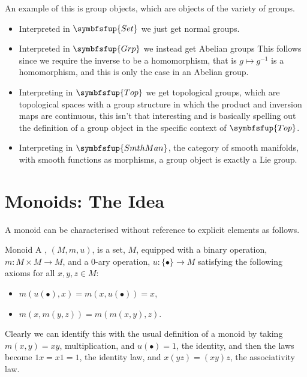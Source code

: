\documentclass[fleqn]{NotesClass}
\makeatletter
\newcommand{\c@egory}[1]{\symbfsfup{#1}}
\newcommand{\Set}{\c@egory{Set}}
\newcommand{\Grp}{\c@egory{Grp}}
\newcommand{\Top}{\c@egory{Top}}
\makeatother
\begin{document}
    An example of this is group objects, which are objects of the variety of groups.
    \begin{itemize}
        \item Interpreted in \(\Set\) we just get normal groups.
        \item Interpreted in \(\Grp\) we instead get Abelian groups
        This follows since we require the inverse to be a homomorphism, that is \(g \mapsto g^{-1}\) is a homomorphism, and this is only the case in an Abelian group.
        \item Interpreting in \(\Top\) we get topological groups, which are topological spaces with a group structure in which the product and inversion maps are continuous, this isn't that interesting and is basically spelling out the definition of a group object in the specific context of \(\Top\).
        \item Interpreting in \(\makeatletter\c@egory{SmthMan}\makeatother\), the category of smooth manifolds, with smooth functions as morphisms, a group object is exactly a Lie group.
    \end{itemize}
    
    \section{Monoids: The Idea}
    A monoid can be characterised without reference to explicit elements as follows.
    \begin{dfn}{Monoid}{}
        A , \((M, m, u)\), is a set, \(M\), equipped with a binary operation, \(m \colon M \times M \to M\), and a 0-ary operation, \(u \colon \{\bullet\} \to M\) satisfying the following axioms for all \(x, y, z \in M\):
        \begin{itemize}
            \item \(m(u(\bullet), x) = m(x, u(\bullet)) = x\),
            \item \(m(x, m(y, z)) = m(m(x, y), z)\).
        \end{itemize}
    \end{dfn}
    
    Clearly we can identify this with the usual definition of a monoid by taking \(m(x, y) = xy\), multiplication, and \(u(\bullet) = 1\), the identity, and then the laws become \(1x = x1 = 1\), the identity law, and \(x(yz) = (xy)z\), the associativity law.
    
\end{document}
